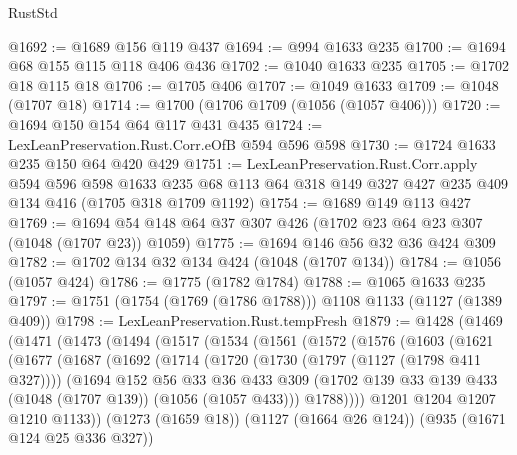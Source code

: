 \begin{lexlean}{RustStd}
\begin{coremodule}
@1692 := @1689 @156 @119 @437
@1694 := @994 @1633 @235
@1700 := @1694 @68 @155 @115 @118 @406 @436
@1702 := @1040 @1633 @235
@1705 := @1702 @18 @115 @18
@1706 := @1705 @406
@1707 := @1049 @1633
@1709 := @1048 (@1707 @18)
@1714 := @1700 (@1706 @1709 (@1056 (@1057 @406)))
@1720 := @1694 @150 @154 @64 @117 @431 @435
@1724 := LexLeanPreservation.Rust.Corr.eOfB @594 @596 @598
@1730 := @1724 @1633 @235 @150 @64 @420 @429
@1751 := LexLeanPreservation.Rust.Corr.apply
    @594
    @596
    @598
    @1633
    @235
    @68
    @113
    @64
    @318
    @149
    @327
    @427
    @235
    @409
    @134
    @416
    (@1705 @318 @1709 @1192)
@1754 := @1689 @149 @113 @427
@1769 := @1694 @54 @148 @64 @37 @307 @426 (@1702 @23 @64 @23 @307 (@1048 (@1707 @23)) @1059)
@1775 := @1694 @146 @56 @32 @36 @424 @309
@1782 := @1702 @134 @32 @134 @424 (@1048 (@1707 @134))
@1784 := @1056 (@1057 @424)
@1786 := @1775 (@1782 @1784)
@1788 := @1065 @1633 @235
@1797 := @1751 (@1754 (@1769 (@1786 @1788))) @1108 @1133 (@1127 (@1389 @409))
@1798 := LexLeanPreservation.Rust.tempFresh
@1879 := @1428
    (@1469
      (@1471
        (@1473
          (@1494
            (@1517
              (@1534
                (@1561
                  (@1572
                    (@1576
                      (@1603
                        (@1621
                          (@1677
                            (@1687
                              (@1692
                                (@1714
                                  (@1720
                                    (@1730 (@1797 (@1127 (@1798 @411 @327))))
                                    (@1694
                                      @152
                                      @56
                                      @33
                                      @36
                                      @433
                                      @309
                                      (@1702
                                        @139
                                        @33
                                        @139
                                        @433
                                        (@1048 (@1707 @139))
                                        (@1056 (@1057 @433)))
                                      @1788))))
                              @1201
                              @1204
                              @1207
                              @1210
                              @1133))
                          (@1273 (@1659 @18))
                          (@1127 (@1664 @26 @124))
                          (@935 (@1671 @124 @25 @336 @327))

\end{coremodule}
\end{lexlean}

